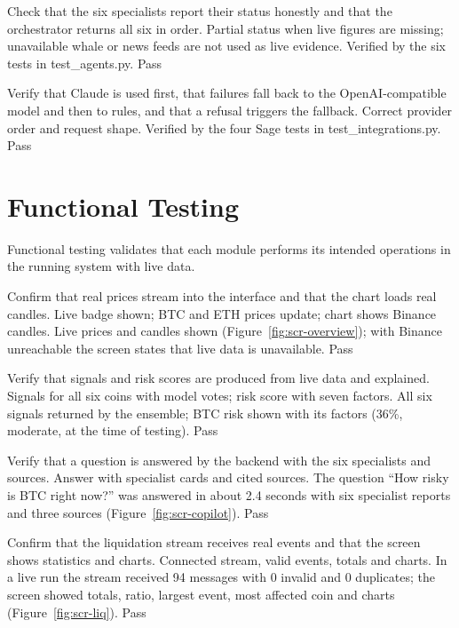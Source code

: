 {Check that the six specialists report their status honestly and that the orchestrator returns all six in order.}
{Partial status when live figures are missing; unavailable whale or news feeds are not used as live evidence.}
{Verified by the six tests in test\_agents.py.}
{Pass}

{Verify that Claude is used first, that failures fall back to the OpenAI-compatible model and then to rules, and that a refusal triggers the fallback.}
{Correct provider order and request shape.}
{Verified by the four Sage tests in test\_integrations.py.}
{Pass}

\section{Functional Testing}
Functional testing validates that each module performs its intended operations in the running system with live data.

{Confirm that real prices stream into the interface and that the chart loads real candles.}
{Live badge shown; BTC and ETH prices update; chart shows Binance candles.}
{Live prices and candles shown (Figure~\ref{fig:scr-overview}); with Binance unreachable the screen states that live data is unavailable.}
{Pass}

{Verify that signals and risk scores are produced from live data and explained.}
{Signals for all six coins with model votes; risk score with seven factors.}
{All six signals returned by the ensemble; BTC risk shown with its factors (36\%, moderate, at the time of testing).}
{Pass}

{Verify that a question is answered by the backend with the six specialists and sources.}
{Answer with specialist cards and cited sources.}
{The question ``How risky is BTC right now?'' was answered in about 2.4 seconds with six specialist reports and three sources (Figure~\ref{fig:scr-copilot}).}
{Pass}

{Confirm that the liquidation stream receives real events and that the screen shows statistics and charts.}
{Connected stream, valid events, totals and charts.}
{In a live run the stream received 94 messages with 0 invalid and 0 duplicates; the screen showed totals, ratio, largest event, most affected coin and charts (Figure~\ref{fig:scr-liq}).}
{Pass}

